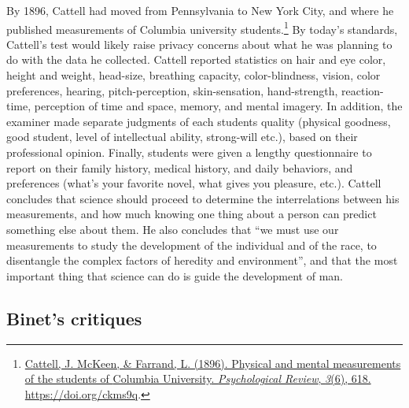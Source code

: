 \documentclass[
  oneside,
  12pt]{crumpbook}
\begin{document}
By 1896, Cattell had moved from Pennsylvania to New York City, and where he published measurements of Columbia university students.\footnote{\protect\hyperlink{ref-cattellPhysicalMentalMeasurements1896}{Cattell, J. McKeen, \& Farrand, L. (1896). Physical and mental measurements of the students of {Columbia University}. \emph{Psychological Review}, \emph{3}(6), 618. \url{https://doi.org/ckms9q}}.} By today's standards, Cattell's test would likely raise privacy concerns about what he was planning to do with the data he collected. Cattell reported statistics on hair and eye color, height and weight, head-size, breathing capacity, color-blindness, vision, color preferences, hearing, pitch-perception, skin-sensation, hand-strength, reaction-time, perception of time and space, memory, and mental imagery. In addition, the examiner made separate judgments of each students quality (physical goodness, good student, level of intellectual ability, strong-will etc.), based on their professional opinion. Finally, students were given a lengthy questionnaire to report on their family history, medical history, and daily behaviors, and preferences (what's your favorite novel, what gives you pleasure, etc.). Cattell concludes that science should proceed to determine the interrelations between his measurements, and how much knowing one thing about a person can predict something else about them. He also concludes that ``we must use our measurements to study the development of the individual and of the race, to disentangle the complex factors of heredity and environment'', and that the most important thing that science can do is guide the development of man.

\hypertarget{binets-critiques}{%
\subsection{Binet's critiques}\label{binets-critiques}}
\end{document}
